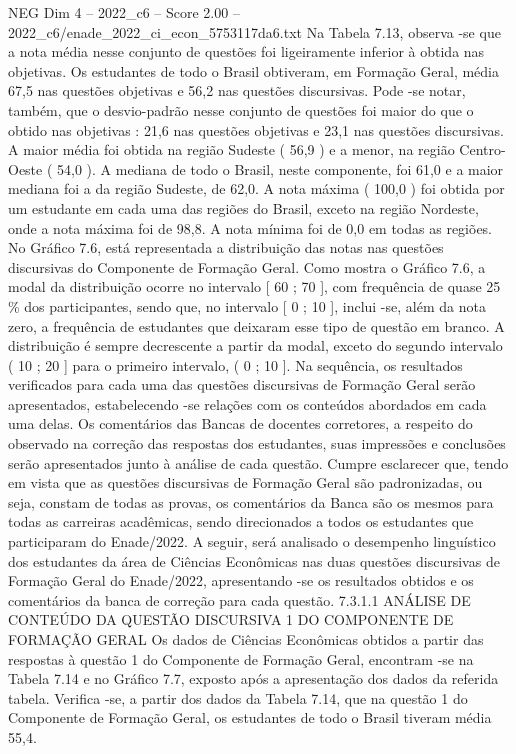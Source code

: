 \begin{textsample}{NEG Dim 4 – 2022\_c6 – Score 2.00 – 2022\_c6/enade\_2022\_ci\_econ\_5753117da6.txt}
Na Tabela 7.13, observa -se que a nota média nesse conjunto de questões foi ligeiramente inferior à obtida nas objetivas.
Os estudantes de todo o Brasil obtiveram, em Formação Geral, média 67,5 nas questões objetivas e 56,2 nas questões discursivas.
Pode -se notar, também, que o desvio-padrão nesse conjunto de questões foi maior do que o obtido nas objetivas : 21,6 nas questões objetivas e 23,1 nas questões discursivas.
A maior média foi obtida na região Sudeste ( 56,9 ) e a menor, na região Centro-Oeste ( 54,0 ).
A mediana de todo o Brasil, neste componente, foi 61,0 e a maior mediana foi a da região Sudeste, de 62,0.
A nota máxima ( 100,0 ) foi obtida por um estudante em cada uma das regiões do Brasil, exceto na região Nordeste, onde a nota máxima foi de 98,8.
A nota mínima foi de 0,0 em todas as regiões.
No Gráfico 7.6, está representada a distribuição das notas nas questões discursivas do Componente de Formação Geral.
Como mostra o Gráfico 7.6, a modal da distribuição ocorre no intervalo [ 60 ; 70 ], com frequência de quase 25 \% dos participantes, sendo que, no intervalo [ 0 ; 10 ], inclui -se, além da nota zero, a frequência de estudantes que deixaram esse tipo de questão em branco.
A distribuição é sempre decrescente a partir da modal, exceto do segundo intervalo ( 10 ; 20 ] para o primeiro intervalo, ( 0 ; 10 ].
Na sequência, os resultados verificados para cada uma das questões discursivas de Formação Geral serão apresentados, estabelecendo -se relações com os conteúdos abordados em cada uma delas.
Os comentários das Bancas de docentes corretores, a respeito do observado na correção das respostas dos estudantes, suas impressões e conclusões serão apresentados junto à análise de cada questão.
Cumpre esclarecer que, tendo em vista que as questões discursivas de Formação Geral são padronizadas, ou seja, constam de todas as provas, os comentários da Banca são os mesmos para todas as carreiras acadêmicas, sendo direcionados a todos os estudantes que participaram do Enade/2022.
A seguir, será analisado o desempenho linguístico dos estudantes da área de Ciências Econômicas nas duas questões discursivas de Formação Geral do Enade/2022, apresentando -se os resultados obtidos e os comentários da banca de correção para cada questão. 7.3.1.1 ANÁLISE DE CONTEÚDO DA QUESTÃO DISCURSIVA 1 DO COMPONENTE DE FORMAÇÃO GERAL Os dados de Ciências Econômicas obtidos a partir das respostas à questão 1 do Componente de Formação Geral, encontram -se na Tabela 7.14 e no Gráfico 7.7, exposto após a apresentação dos dados da referida tabela.
Verifica -se, a partir dos dados da Tabela 7.14, que na questão 1 do Componente de Formação Geral, os estudantes de todo o Brasil tiveram média 55,4.

\end{textsample}

